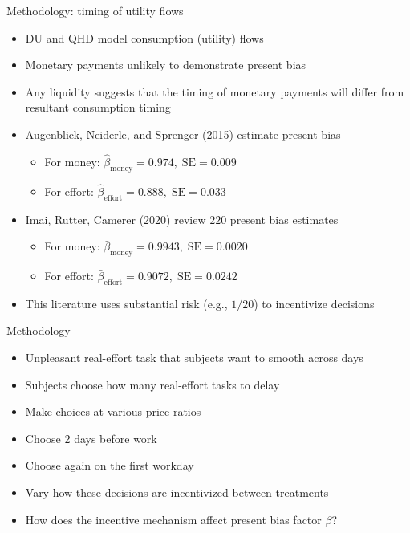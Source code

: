 \documentclass[professionalfont,10pt]{beamer}
\begin{document}
\begin{frame}{Methodology: timing of utility flows}
\begin{itemize}[<+->]
\item DU and QHD model \alert{consumption (utility) flows}
\item Monetary payments unlikely to demonstrate present bias
\vspace{1\baselineskip}
\item Any liquidity suggests that the timing of monetary payments will differ from resultant consumption timing
\vspace{1\baselineskip}
\item Augenblick, Neiderle, and Sprenger (2015) estimate present bias
\begin{itemize}[<+->]
\item For money: $\hat\beta_\text{money}=0.974, \;\text{SE}=0.009$
\item For effort: $\hat\beta_\text{effort}=0.888, \;\text{SE}=0.033$
\end{itemize}
\vspace{1\baselineskip}
\item Imai, Rutter, Camerer (2020) review $220$ present bias estimates
\begin{itemize}[<+->]
\item For money: $\bar{\beta}_\text{money}=0.9943, \;\text{SE}=0.0020$
\item For effort: $\bar{\beta}_\text{effort}=0.9072, \;\text{SE}=0.0242$
\end{itemize}
\vspace{1\baselineskip}
\item This literature uses substantial risk (e.g., $1/20$) to incentivize decisions
\end{itemize}
\end{frame}

\begin{frame}{Methodology}
\begin{itemize}[<+->]
\item Unpleasant real-effort task that subjects want to smooth across days
\item Subjects choose how many real-effort tasks to delay
\item Make choices at various price ratios
\vspace{1\baselineskip}
\item Choose 2 days before work
\item Choose again on the first workday
\item Vary how these decisions are incentivized between treatments
\vspace{1\baselineskip}
\item How does the incentive mechanism affect present bias factor $\beta$?
\end{itemize}
\end{frame}
\end{document}
